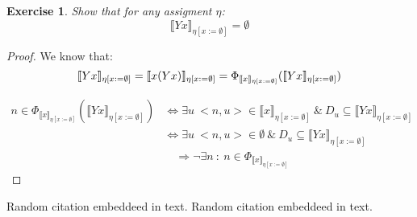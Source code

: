 \documentclass{article}
\newtheorem{exercise}{Exercise}[section]
\begin{document}
	\begin{exercise}
		Show that for any assigment $\eta$:
			\begin{equation}
				\llbracket Yx \rrbracket_{\eta[x := \emptyset]} 
					= \emptyset
			\end{equation}
	\end{exercise}
	\begin{proof}
		We know that: 
		\begin{equation}
			\llbracket Yx \rrbracket_{\eta [x := \emptyset]} =
				\llbracket x(Yx) \rrbracket_{\eta [x := \emptyset]}\\
			= \Phi_
					{\llbracket x \rrbracket_{\eta[x := \emptyset]}} 
					(\llbracket Yx \rrbracket_{\eta[x := \emptyset]})
		\end{equation}

		\begin{equation*}
		\begin{split}
			n \in \Phi_
					{\llbracket x \rrbracket_{\eta[x := \emptyset]}} 
					(\llbracket Yx \rrbracket_{\eta[x := \emptyset]})
				&\iff \exists u \: <n, u> \in 
				\llbracket x \rrbracket_{\eta[x := \emptyset]} 
					\:\&\: D_u \subseteq 
						\llbracket Yx \rrbracket_{\eta[x := \emptyset]}\\
				&\iff \exists u \: <n, u> \in \emptyset 
					\:\&\: D_u \subseteq 
						\llbracket Yx \rrbracket_{\eta[x := \emptyset]}\\
				&\quad\Rightarrow \neg \exists n\: :\: 
					n \in \Phi_{\llbracket x \rrbracket_{
						\eta[x := \emptyset]}}
		\end{split}
		\end{equation*}
	\end{proof}
	Random citation \cite{COM_COOPER} embeddeed in text.
	Random citation \cite{COM_ODIFREDDI} embeddeed in text.

	\newpage
	
	
\end{document}
